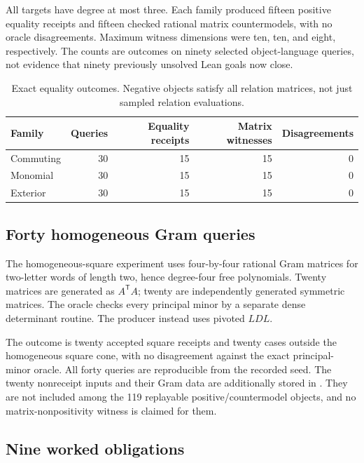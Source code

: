 All targets have degree at most three. Each family produced fifteen positive
equality receipts and fifteen checked rational matrix countermodels, with no
oracle disagreements. Maximum witness dimensions were ten, ten, and eight,
respectively. The counts are outcomes on ninety selected object-language
queries, not evidence that ninety previously unsolved Lean goals now close.

\begin{table}[ht]
\centering\small
\begin{tabular}{@{}lrrrr@{}}
\toprule Family & Queries & Equality receipts & Matrix witnesses & Disagreements\\
\midrule
Commuting & 30 & 15 & 15 & 0\\
Monomial & 30 & 15 & 15 & 0\\
Exterior & 30 & 15 & 15 & 0\\
\bottomrule
\end{tabular}
\caption{Exact equality outcomes. Negative objects satisfy all relation matrices,
not just sampled relation evaluations.}
\end{table}

\subsection{Forty homogeneous Gram queries}

The homogeneous-square experiment uses four-by-four rational Gram matrices for
two-letter words of length two, hence degree-four free polynomials. Twenty
matrices are generated as $A^{\mathsf T}A$; twenty are independently generated
symmetric matrices. The oracle checks every principal minor by a separate dense
determinant routine. The producer instead uses pivoted $LDL$.

The outcome is twenty accepted square receipts and twenty cases outside the
homogeneous square cone, with no disagreement against the exact principal-minor
oracle. All forty queries are reproducible from the recorded seed. The twenty
nonreceipt inputs and their Gram data are additionally stored in
. They are not included among the
119 replayable positive/countermodel objects, and no matrix-nonpositivity witness
is claimed for them.

\subsection{Nine worked obligations}

